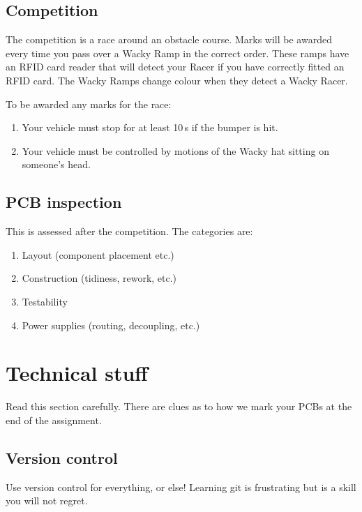 \documentclass[11pt, a4paper]{article}
\begin{document}
\subsection{Competition}

The competition is a race around an obstacle course.  Marks will be
awarded every time you pass over a Wacky Ramp in the correct order.
These ramps have an RFID card reader that will detect your Racer if
you have correctly fitted an RFID card.  The Wacky Ramps change colour
when they detect a Wacky Racer.

To be awarded any marks for the race:
%
\begin{enumerate}
\item Your vehicle must stop for at least 10\,s if the bumper is hit.

\item Your vehicle must be controlled by motions of the Wacky hat
  sitting on someone's head.
\end{enumerate}


\subsection{PCB inspection}

This is assessed after the competition.  The categories are:
%
\begin{enumerate}
\item Layout (component placement etc.)
\item Construction (tidiness, rework, etc.)
\item Testability  
\item Power supplies (routing, decoupling, etc.)
\end{enumerate}



\section{Technical stuff}

Read this section carefully.  There are clues as to how we mark your
PCBs at the end of the assignment.


\subsection{Version control}

Use version control for everything, or else!  Learning git is
frustrating but is a skill you will not regret.
\end{document}
